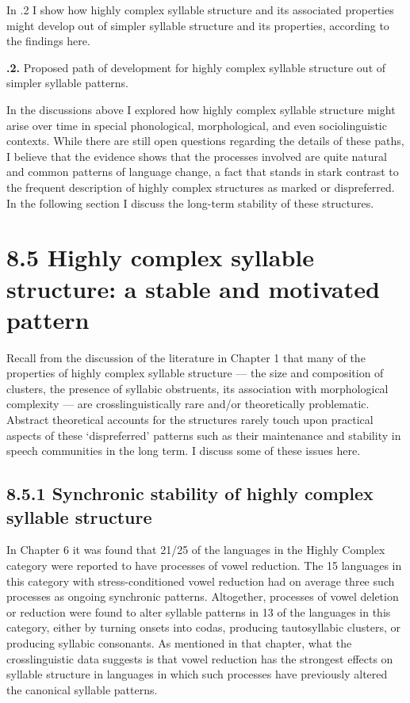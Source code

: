   In .2 I show how highly complex syllable structure and its associated properties might develop out of simpler syllable structure and its properties, according to the findings here.


\textbf{.2.} Proposed path of development for highly complex syllable structure out of simpler syllable patterns.

  In the discussions above I explored how highly complex syllable structure might arise over time in special phonological, morphological, and even sociolinguistic contexts. While there are still open questions regarding the details of these paths, I believe that the evidence shows that the processes involved are quite natural and common patterns of language change, a fact that stands in stark contrast to the frequent description of highly complex structures as marked or dispreferred. In the following section I discuss the long-term stability of these structures.

\section{8.5 Highly complex syllable structure: a stable and motivated pattern}

  Recall from the discussion of the literature in Chapter 1 that many of the properties of highly complex syllable structure — the size and composition of clusters, the presence of syllabic obstruents, its association with morphological complexity — are crosslinguistically rare and/or theoretically problematic. Abstract theoretical accounts for the structures rarely touch upon practical aspects of these ‘dispreferred’ patterns such as their maintenance and stability in speech communities in the long term. I discuss some of these issues here.

\subsection{8.5.1 Synchronic stability of highly complex syllable structure}

  In Chapter 6 it was found that 21/25 of the languages in the Highly Complex category were reported to have processes of vowel reduction. The 15 languages in this category with stress-conditioned vowel reduction had on average three such processes as ongoing synchronic patterns. Altogether, processes of vowel deletion or reduction were found to alter syllable patterns in 13 of the languages in this category, either by turning onsets into codas, producing tautosyllabic clusters, or producing syllabic consonants. As mentioned in that chapter, what the crosslinguistic data suggests is that vowel reduction has the strongest effects on syllable structure in languages in which such processes have previously altered the canonical syllable patterns.

